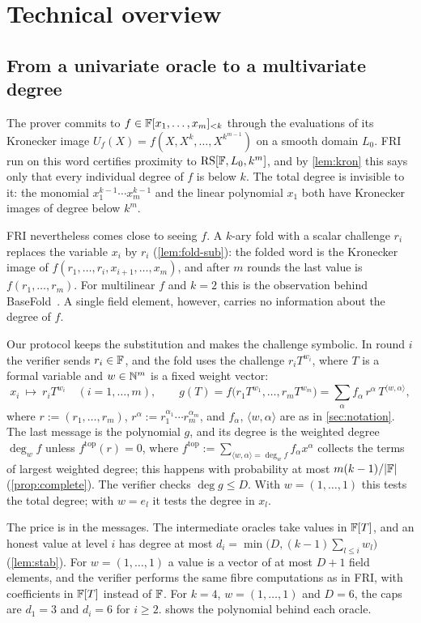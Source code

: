 \section{Technical overview}\label{sec:overview}

\subsection{From a univariate oracle to a multivariate degree}\label{sec:ov-idea}

The prover commits to $f\in\mathbb{F}[x_1,\dots,x_m]_{<k}$ through the evaluations of its
Kronecker image $U_f(X)=f(X,X^k,\dots,X^{k^{m-1}})$ on a smooth domain $L_0$. FRI run on
this word certifies proximity to $\mathrm{RS}[\mathbb{F},L_0,k^m]$, and by \cref{lem:kron} this says only
that every individual degree of $f$ is below $k$. The total degree is invisible to it: the
monomial $x_1^{k-1}\cdots x_m^{k-1}$ and the linear polynomial $x_1$ both have Kronecker
images of degree below $k^m$.

FRI nevertheless comes close to seeing $f$. A $k$-ary fold with a scalar challenge $r_i$
replaces the variable $x_i$ by $r_i$ (\cref{lem:fold-sub}): the folded word is the Kronecker
image of $f(r_1,\dots,r_i,x_{i+1},\dots,x_m)$, and after $m$ rounds the last value is
$f(r_1,\dots,r_m)$. For multilinear $f$ and $k=2$ this is the observation behind
BaseFold~\cite{ZCF24}. A single field element, however, carries no information about the
degree of $f$.

Our protocol keeps the substitution and makes the challenge symbolic. In round $i$ the
verifier sends $r_i\in\mathbb{F}$, and the fold uses the challenge $r_iT^{w_i}$, where $T$ is a formal
variable and $w\in\mathbb{N}^m$ is a fixed weight vector:
\[
x_i\ \longmapsto\ r_iT^{w_i}\quad(i=1,\dots,m),\qquad
g(T)=f\big(r_1T^{w_1},\dots,r_mT^{w_m}\big)=\sum_\alpha f_\alpha\,r^\alpha\,T^{\langle w,\alpha\rangle},
\]
where $r:=(r_1,\dots,r_m)$, $r^\alpha:=r_1^{\alpha_1}\cdots r_m^{\alpha_m}$, and
$f_\alpha$, $\langle w,\alpha\rangle$ are as in \cref{sec:notation}.
The last message is the polynomial $g$, and its degree is the weighted degree $\deg_wf$
unless $f^{\mathrm{top}}(r)=0$, where
$f^{\mathrm{top}}:=\sum_{\langle w,\alpha\rangle=\deg_wf}f_\alpha x^\alpha$ collects the terms of
largest weighted degree; this happens with probability at most
$m(k-1)/|\mathbb{F}|$ (\cref{prop:complete}). The verifier checks $\deg g\le D$. With
$w=(1,\dots,1)$ this tests the total degree; with $w=e_l$ it tests the degree in $x_l$.

The price is in the messages. The intermediate oracles take values in $\mathbb{F}[T]$, and an honest
value at level $i$ has degree at most $d_i=\min\big(D,(k-1)\sum_{l\le i}w_l\big)$
(\cref{lem:stab}). For $w=(1,\dots,1)$ a value is a vector of at most $D+1$ field elements,
and the verifier performs the same fibre computations as in FRI, with coefficients in $\mathbb{F}[T]$
instead of $\mathbb{F}$. For $k=4$, $w=(1,\dots,1)$ and $D=6$, the caps are $d_1=3$ and
$d_i=6$ for $i\ge2$.  shows the polynomial behind each oracle.

